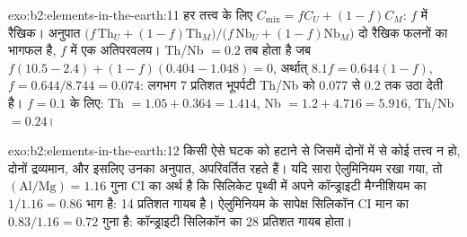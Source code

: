 \begin{solution}{exo:b2:elements-in-the-earth:11}
हर तत्त्व के लिए $C_{\mathrm{mix}} = fC_U + (1-f)C_M$: $f$ में रैखिक। अनुपात
$\bigl(f\,\mathrm{Th}_U + (1-f)\mathrm{Th}_M\bigr)/\bigl(f\,\mathrm{Nb}_U +
(1-f)\mathrm{Nb}_M\bigr)$ दो रैखिक फलनों का भागफल है, $f$ में एक अतिपरवलय।
Th/Nb $= 0.2$ तब होता है जब $f(10.5-2.4) + (1-f)(0.404-1.048) = 0$, अर्थात् $8.1f = 0.644(1-f)$,
$f = 0.644/8.744 = 0.074$: लगभग 7 प्रतिशत भूपर्पटी Th/Nb को 0.077 से 0.2 तक उठा देती है।
$f = 0.1$ के लिए: Th $= 1.05 + 0.364 = 1.414$, Nb $= 1.2 + 4.716 = 5.916$, Th/Nb $= 0.24$।
\end{solution}

\begin{solution}{exo:b2:elements-in-the-earth:12}
किसी ऐसे घटक को हटाने से जिसमें दोनों में से कोई तत्त्व न हो, दोनों द्रव्यमान, और इसलिए उनका अनुपात,
अपरिवर्तित रहते हैं। यदि सारा ऐलुमिनियम रखा गया, तो $(\mathrm{Al}/\mathrm{Mg}) = 1.16$ गुना CI
का अर्थ है कि सिलिकेट पृथ्वी में अपने कॉन्ड्राइटी मैग्नीशियम का $1/1.16 = 0.86$ भाग है: 14 प्रतिशत
गायब है। ऐलुमिनियम के सापेक्ष सिलिकॉन CI मान का $0.83/1.16 = 0.72$ गुना है:
कॉन्ड्राइटी सिलिकॉन का 28 प्रतिशत गायब होता।
\end{solution}

